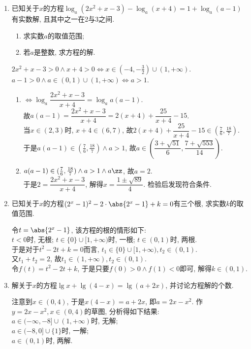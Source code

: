 \begin{enumerate}
\begin{enumerate}
\item 已知关于$x$的方程$\log_a(2x^2+x-3)-\log_a(x+4)=1+\log_a(a-1)$有实数解, 且其中之一在2与3之间. 
\begin{enumerate}[(1)]
\item 求实数$a$的取值范围; 
\item 若$a$是整数, 求方程的解.
\end{enumerate}
\begin{jieda}
$2x^2+x-3>0\land x+4>0\iff x\in(-4,-\frac{3}{2})\cup(1,+\infty)$. \\
$a-1>0\land a\in(0,1)\cup(1,+\infty)\iff a>1$. 
\begin{enumerate}[(1)]
\item $\iff \log_a\dfrac{2x^2+x-3}{x+4}=\log_aa(a-1)$. \\
故$a(a-1)=\dfrac{2x^2+x-3}{x+4}=2(x+4)+\dfrac{25}{x+4}-15$. \\
当$x\in(2,3)$时, $x+4\in(6,7)$, 故$2(x+4)+\dfrac{25}{x+4}-15\in(\frac{7}{6},\frac{18}{7})$. \\
于是$a(a-1)\in(\frac{7}{6},\frac{18}{7})\land a>1$, 故$a\in\left(\dfrac{3+\sqrt{51}}{6},\dfrac{7+\sqrt{553}}{14}\right)$. 

\item $a(a-1)\in(\frac{7}{6},\frac{18}{7})\land a>1\land a\zz$, 故$a=2$. \\
于是$2=\dfrac{2x^2+x-3}{x+4}$, 解得$x=\dfrac{1\pm\sqrt{89}}{4}$. 检验后发现符合条件. 
\end{enumerate}
\end{jieda}


\item 已知关于$x$的方程$(2^x-1)^2-2\cdot\abs{2^x-1}+k=0$有三个根, 求实数$k$的取值范围. 
\begin{jieda}
令$t=\abs{2^x-1}$, 该方程的根的情形如下: \\
$t<0$时, 无根; $t\in\{0\}\cup[1,+\infty)$时, 一根; $t\in(0,1)$时, 两根. \\
于是对于$t^2-2t+k=0$而言, $t_1\in\{0\}\cup[1,+\infty), t_2\in(0,1)$. \\
又$t_1+t_2=2$, 故$t_1\in(1,+\infty),t_2\in(0,1)$. \\
令$f(t)=t^2-2t+k$, 于是只要$f(0)>0\land f(1)<0$即可, 解得$k\in(0,1)$. 
\end{jieda}


\item 解关于$x$的方程$\lg{x}+\lg(4-x)=\lg(a+2x)$, 并讨论方程解的个数. 
\begin{jieda}
注意到$x\in(0,4)$, 于是$x(4-x)=a+2x$, 即$a=2x-x^2$. 
作$y=2x-x^2, x\in(0,4)$的草图, 分析得如下结果: \\
$a\in(-\infty,-8]\cup(1,+\infty)$时, 无解; \\
$a\in(-8,0]\cup\{1\}$时, 一解; \\
$a\in(0,1)$时, 两解. 
\end{jieda}



\end{enumerate}
\end{enumerate}
